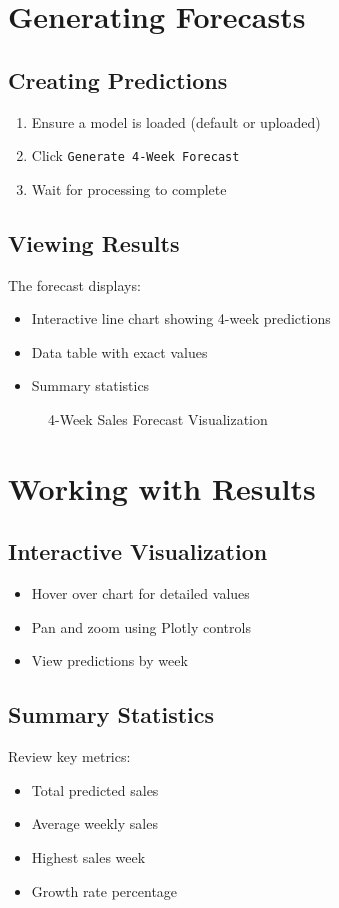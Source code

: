\section{Generating Forecasts}

\subsection{Creating Predictions}
\begin{enumerate}
	\item Ensure a model is loaded (default or uploaded)
	\item Click \texttt{Generate 4-Week Forecast}
	\item Wait for processing to complete
\end{enumerate}

\subsection{Viewing Results}
The forecast displays:
\begin{itemize}
	\item Interactive line chart showing 4-week predictions
	\item Data table with exact values
	\item Summary statistics
\end{itemize}

\begin{figure}[h]
	\centering
	\caption{4-Week Sales Forecast Visualization}
\end{figure}

\section{Working with Results}

\subsection{Interactive Visualization}
\begin{itemize}
	\item Hover over chart for detailed values
	\item Pan and zoom using Plotly controls
	\item View predictions by week
\end{itemize}

\subsection{Summary Statistics}
Review key metrics:
\begin{itemize}
	\item Total predicted sales
	\item Average weekly sales
	\item Highest sales week
	\item Growth rate percentage
\end{itemize}

